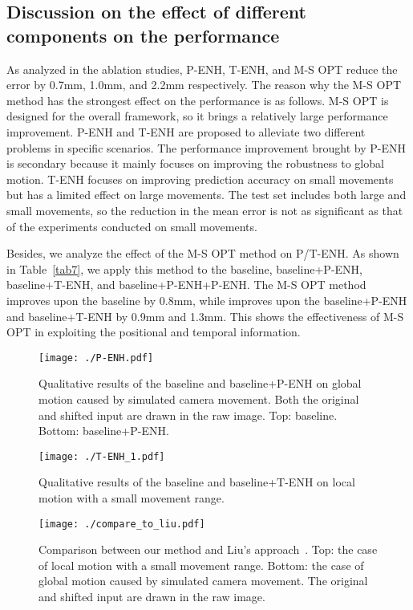 \documentclass[sigconf]{acmart}
\begin{document}
\begin{multicols}{2}
\section{Discussion on the effect of different components on the performance}
As analyzed in the ablation studies, P-ENH, T-ENH, and M-S OPT reduce the error by 0.7mm, 1.0mm, and 2.2mm respectively. The reason why the M-S OPT method has the strongest effect on the performance is as follows. M-S OPT is designed for the overall framework, so it brings a relatively large performance improvement. P-ENH and T-ENH are proposed to alleviate two different problems in specific scenarios. The performance improvement brought by P-ENH is secondary because it mainly focuses on improving the robustness to global motion. T-ENH focuses on improving prediction accuracy on small movements but has a limited effect on large movements. The test set includes both large and small movements, so the reduction in the mean error is not as significant as that of the experiments conducted on small movements.

Besides, we analyze the effect of the M-S OPT method on P/T-ENH. As shown in Table~\ref{tab7}, we apply this method to the baseline, baseline+P-ENH, baseline+T-ENH, and baseline+P-ENH+P-ENH. The M-S OPT method improves upon the baseline by 0.8mm, while improves upon the baseline+P-ENH and baseline+T-ENH by 0.9mm and 1.3mm. This shows the effectiveness of M-S OPT in exploiting the positional and temporal information.

\begin{figure*}
  \centering
  \texttt{[image: ./P-ENH.pdf]}
  \caption{Qualitative results of the baseline and baseline+P-ENH on global motion caused by simulated  camera movement. Both the original and shifted input are drawn in the raw image. Top: baseline. Bottom: baseline+P-ENH.}
  \label{img8}
\end{figure*}
\begin{figure*}[ht]
  \centering
  \texttt{[image: ./T-ENH\_1.pdf]}
  \caption{Qualitative results of the baseline and baseline+T-ENH on local motion with a small movement range.}
  \label{img9}
\end{figure*}

\begin{figure*}
  \texttt{[image: ./compare\_to\_liu.pdf]}
  \caption{Comparison between our method and Liu's approach~\protect{}. Top: the case of local motion with a small movement range. Bottom: the case of global motion caused by simulated camera movement. The original and shifted input are drawn in the raw image. }
  \label{img1}
\end{figure*}




\end{multicols}
\end{document}
